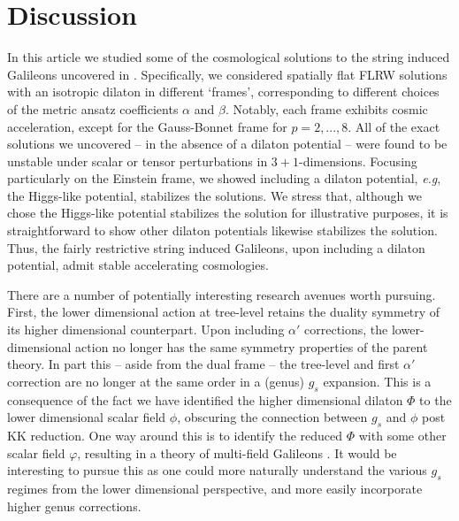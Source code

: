 \documentclass[amsmath,amssymb,11pt]{article}
\begin{document}







\section{Discussion} \label{sec:disc}

In this article we studied some of the cosmological solutions to the string induced Galileons uncovered in \cite{Easson:2020bgk}. Specifically, we considered spatially flat FLRW solutions with an isotropic dilaton in different  `frames', corresponding to different choices of the metric ansatz coefficients $\alpha$ and $\beta$. Notably, each frame exhibits cosmic acceleration, except for the Gauss-Bonnet frame for $p=2,...,8$. All of the exact solutions we uncovered -- in the absence of a dilaton potential -- were found to be unstable under scalar or tensor perturbations in $3+1$-dimensions. Focusing particularly on the Einstein frame, we showed including a dilaton potential, \emph{e.g}, the Higgs-like potential, stabilizes the solutions. We stress that, although we chose the Higgs-like potential stabilizes the solution for illustrative purposes, it is straightforward to show other dilaton potentials likewise stabilizes the solution. Thus, the fairly restrictive string induced Galileons, upon including a dilaton potential, admit stable accelerating cosmologies. 


There are a number of potentially interesting research avenues worth pursuing. First, the lower dimensional action at tree-level retains the duality symmetry of its higher dimensional counterpart. Upon including $\alpha'$ corrections, the lower-dimensional action no longer has the same symmetry properties of the parent theory. In part this -- aside from the dual frame -- the tree-level and first $\alpha'$ correction are no longer at the same order in a (genus) $g_{s}$ expansion. This is a consequence of the fact we have identified the higher dimensional dilaton $\Phi$ to the lower dimensional scalar field $\phi$, obscuring the connection between $g_{s}$ and $\phi$ post KK reduction. One way around this is to identify the reduced $\Phi$ with some other scalar field $\varphi$, resulting in a theory of multi-field Galileons \cite{Padilla:2010de,Padilla:2010ir,Deffayet:2010zh,Hinterbichler:2010xn}. It would be interesting to pursue this as one could more naturally understand the various $g_{s}$ regimes from the lower dimensional perspective, and more easily incorporate higher genus corrections. 
\end{document}
